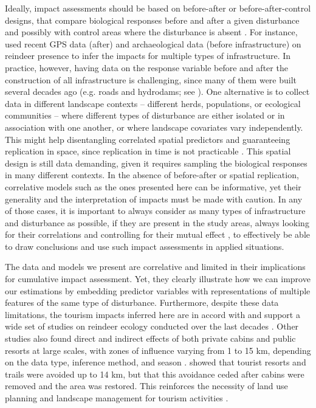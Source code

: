 \documentclass[titlepage]{article}
\begin{document}
Ideally, impact assessments should be based on before-after or before-after-control designs, that compare biological responses before and after a given disturbance and possibly with control areas where the disturbance is absent \citep[e.g.][]{boulanger_estimation_2021,skarin_out_2018}. For instance, \citet{panzacchi_learning_2013} used recent GPS data (after) and archaeological data (before infrastructure) on reindeer presence to infer the impacts for multiple types of infrastructure. In practice, however, having data on the response variable before and after the construction of all infrastructure is challenging, since many of them were built several decades ago (e.g. roads and hydrodams; see \citealt{dorber_indicators_2022}). One alternative is to collect data in different landscape contexts -- different herds, populations, or ecological communities --  where different types of disturbance are either isolated or in association with one another, or where landscape covariates vary independently. This might help disentangling correlated spatial predictors and guaranteeing replication in space, since replication in time is not practicable \citep[e.g.][]{panzacchi_searching_2015}. This spatial design is still data demanding, given it requires sampling the biological responses in many different contexts. In the absence of before-after or spatial replication, correlative models such as the ones presented here can be informative, yet their generality and the interpretation of impacts must be made with caution. In any of those cases, it is important to always consider as many types of infrastructure and disturbance as possible, if they are present in the study areas, always looking for their correlations and controlling for their mutual effect \citep{panzacchi_searching_2015,polfus_identifying_2011}, to effectively be able to draw conclusions and use such impact assessments in applied situations.

The data and models we present are correlative and limited in their implications for cumulative impact assessment. Yet, they clearly illustrate how we can improve our estimations by embedding predictor variables with representations of multiple features of the same type of disturbance. Furthermore, despite these data limitations, the tourism impacts inferred here are in accord with and support a wide set of studies on reindeer ecology conducted over the last decades \citep{gundersen_large-scale_2019, panzacchi_searching_2015, polfus_identifying_2011, nellemann_winter_2001, vistnes_avoidance_2001}. Other studies also found direct and indirect effects of both private cabins and public resorts at large scales, with zones of influence varying from 1 to 15 km, depending on the data type, inference method, and season \citep{panzacchi_learning_2013, panzacchi_searching_2015}. \citet{nellemann_effects_2010} showed that tourist resorts and trails were avoided up to 14 km, but that this avoidance ceded after cabins were removed and the area was restored. This reinforces the necessity of land use planning and landscape management for tourism activities \citep{gundersen_large-scale_2019}.  
\end{document}
